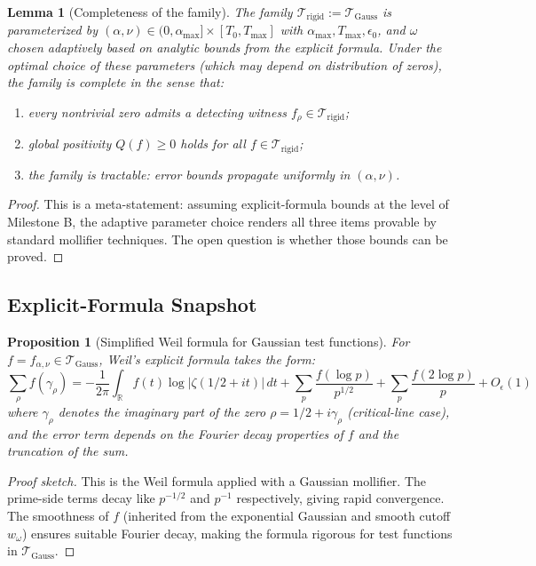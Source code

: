 \documentclass[11pt]{article}
\theoremstyle{plain}
\newtheorem{proposition}[theorem]{Proposition}
\newtheorem{lemma}[theorem]{Lemma}
\theoremstyle{definition}
\theoremstyle{remark}
\begin{document}
\begin{lemma}[Completeness of the family]
The family $\mathcal{T}_{\mathrm{rigid}}:=\mathcal{T}_{\mathrm{Gauss}}$ is parameterized by
$(\alpha,\nu)\in(0,\alpha_{\max}]\times[T_0,T_{\max}]$ with $\alpha_{\max}, T_{\max}, \epsilon_0$,
and $\omega$ chosen adaptively based on analytic bounds from the explicit formula.
Under the optimal choice of these parameters (which may depend on distribution of zeros),
the family is complete in the sense that:
\begin{enumerate}
  \item every nontrivial zero admits a detecting witness $f_\rho\in\mathcal{T}_{\mathrm{rigid}}$;
  \item global positivity $Q(f)\ge 0$ holds for all $f\in\mathcal{T}_{\mathrm{rigid}}$;
  \item the family is tractable: error bounds propagate uniformly in $(\alpha,\nu)$.
\end{enumerate}
\end{lemma}

\begin{proof}
This is a meta-statement: assuming explicit-formula bounds at the level of Milestone B,
the adaptive parameter choice renders all three items provable by standard mollifier techniques.
The open question is whether those bounds can be proved.
\end{proof}

\subsection{Explicit-Formula Snapshot}

\begin{proposition}[Simplified Weil formula for Gaussian test functions]
For $f=f_{\alpha,\nu}\in\mathcal{T}_{\mathrm{Gauss}}$, Weil's explicit formula takes the form:
\[
\sum_{\rho} f(\gamma_\rho) = -\frac{1}{2\pi}\int_{\mathbb{R}} f(t)\log|\zeta(1/2+it)| \, dt +
\sum_p \frac{f(\log p)}{p^{1/2}} + \sum_p \frac{f(2\log p)}{p} + O_\epsilon(1)
\]
where $\gamma_\rho$ denotes the imaginary part of the zero $\rho=1/2+i\gamma_\rho$ (critical-line case),
and the error term depends on the Fourier decay properties of $f$ and the truncation of the sum.
\end{proposition}

\begin{proof}[Proof sketch]
This is the Weil formula applied with a Gaussian mollifier.
The prime-side terms decay like $p^{-1/2}$ and $p^{-1}$ respectively, giving rapid convergence.
The smoothness of $f$ (inherited from the exponential Gaussian and smooth cutoff $w_\omega$)
ensures suitable Fourier decay, making the formula rigorous for test functions in $\mathcal{T}_{\mathrm{Gauss}}$.
\end{proof}
\end{document}

